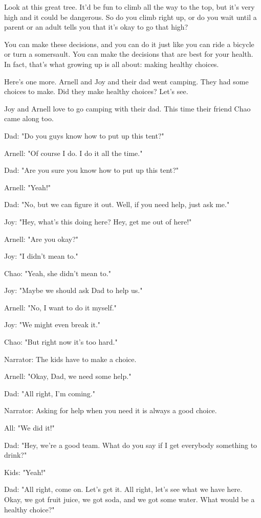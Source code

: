 Look at this great tree. It'd be fun to climb all the way to the top, but it's very high and it could be dangerous. So do you climb right up, or do you wait until a parent or an adult tells you that it's okay to go that high?

You can make these decisions, and you can do it just like you can ride a bicycle or turn a somersault. You can make the decisions that are best for your health. In fact, that's what growing up is all about: making healthy choices.

Here's one more. Arnell and Joy and their dad went camping. They had some choices to make. Did they make healthy choices? Let's see.

Joy and Arnell love to go camping with their dad. This time their friend Chao came along too.

Dad: "Do you guys know how to put up this tent?"

Arnell: "Of course I do. I do it all the time."

Dad: "Are you sure you know how to put up this tent?"

Arnell: "Yeah!"

Dad: "No, but we can figure it out. Well, if you need help, just ask me."

Joy: "Hey, what's this doing here? Hey, get me out of here!"

Arnell: "Are you okay?"

Joy: "I didn't mean to."

Chao: "Yeah, she didn't mean to."

Joy: "Maybe we should ask Dad to help us."

Arnell: "No, I want to do it myself."

Joy: "We might even break it."

Chao: "But right now it's too hard."

Narrator: The kids have to make a choice.

Arnell: "Okay, Dad, we need some help."

Dad: "All right, I'm coming."

Narrator: Asking for help when you need it is always a good choice.

All: "We did it!"

Dad: "Hey, we're a good team. What do you say if I get everybody something to drink?"

Kids: "Yeah!"

Dad: "All right, come on. Let's get it. All right, let's see what we have here. Okay, we got fruit juice, we got soda, and we got some water. What would be a healthy choice?"

